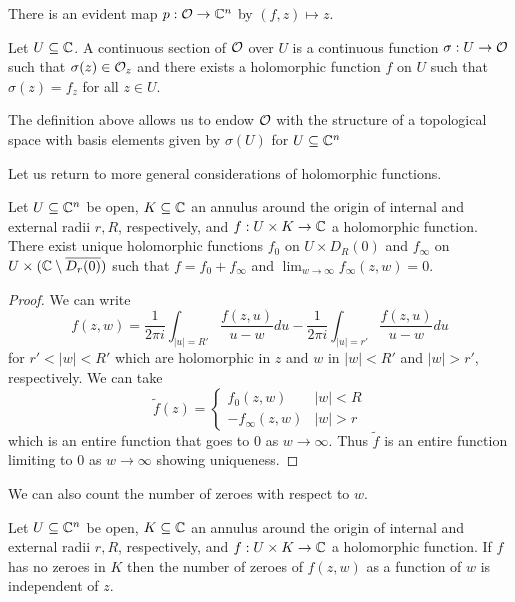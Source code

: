 There is an evident map $p:\mathcal{O}\to\mathbb{C}^{n}$ by $(f,z)\mapsto z$. 
\begin{definition}\label{def: continuous section}
    Let $U\subseteq\mathbb{C}$. A continuous section of $\mathcal{O}$ over $U$ is a continuous function $\sigma:U\to\mathcal{O}$ such that $\sigma(z)\in\mathcal{O}_{z}$ and there exists a holomorphic function $f$ on $U$ such that $\sigma(z)=f_{z}$ for all $z\in U$.
\end{definition}
\begin{remark}
    The definition above allows us to endow $\mathcal{O}$ with the structure of a topological space with basis elements given by $\sigma(U)$ for $U\subseteq\mathbb{C}^{n}$
\end{remark}
Let us return to more general considerations of holomorphic functions. 
\begin{proposition}\label{prop: Laurent decomposition}
    Let $U\subseteq\mathbb{C}^{n}$ be open, $K\subseteq\mathbb{C}$ an annulus around the origin of internal and external radii $r,R$, respectively, and $f:U\times K\to \mathbb{C}$ a holomorphic function. There exist unique holomorphic functions $f_{0}$ on $U\times D_{R}(0)$ and $f_{\infty}$ on $U\times(\mathbb{C}\setminus\overline{D_{r}(0)})$ such that $f=f_{0}+f_{\infty}$ and $\lim_{w\to\infty}f_{\infty}(z,w)=0$.
\end{proposition}
\begin{proof}
    We can write 
    $$f(z,w)=\frac{1}{2\pi i}\int_{|u|=R'}\frac{f(z,u)}{u-w}du - \frac{1}{2\pi i}\int_{|u|=r'}\frac{f(z,u)}{u-w}du$$
    for $r'<|w|<R'$ which are holomorphic in $z$ and $w$ in $|w|<R'$ and $|w|>r'$, respectively. We can take $$\widetilde{f}(z)=\begin{cases}
        f_{0}(z,w) & |w|< R \\ -f_{\infty}(z,w) & |w|>r
    \end{cases}$$
    which is an entire function that goes to 0 as $w\to\infty$. Thus $\widetilde{f}$ is an entire function limiting to 0 as $w\to\infty$ showing uniqueness. 
\end{proof}
We can also count the number of zeroes with respect to $w$. 
\begin{proposition}\label{prop: zero counting}
    Let $U\subseteq\mathbb{C}^{n}$ be open, $K\subseteq\mathbb{C}$ an annulus around the origin of internal and external radii $r,R$, respectively, and $f:U\times K\to \mathbb{C}$ a holomorphic function. If $f$ has no zeroes in $K$ then the number of zeroes of $f(z,w)$ as a function of $w$ is independent of $z$. 
\end{proposition}
